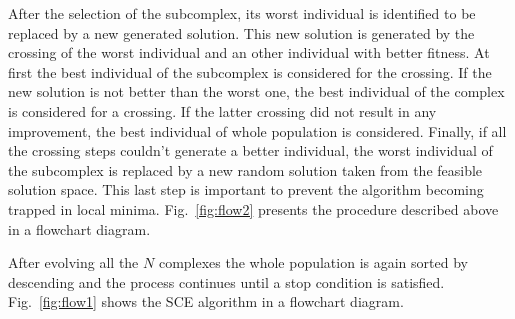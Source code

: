 \documentclass[10pt,conference, compsocconf]{IEEEtran}
\begin{document}
After the selection of the subcomplex, its worst individual is identified to
be replaced by a new generated solution.
This new solution is generated by the crossing of the worst individual and an
other individual with better fitness.
At first the best individual of the subcomplex is considered for the crossing.
If the new solution is not better than the worst one, the best individual
of the complex is considered for a crossing.
If the latter crossing did not result in any improvement, the best individual
of whole population is considered.
Finally, if all the crossing steps couldn't generate a better individual,
the worst individual of the subcomplex is replaced by a new random solution taken
from the feasible solution space.
This last step is important to prevent the algorithm becoming trapped in local minima.
Fig.~\ref{fig:flow2} presents the procedure described above in a flowchart diagram.

After evolving all the $N$ complexes the whole population is again
sorted by descending and the process continues until a stop condition is satisfied.
Fig.~\ref{fig:flow1} shows the SCE algorithm in a flowchart diagram.
\end{document}
